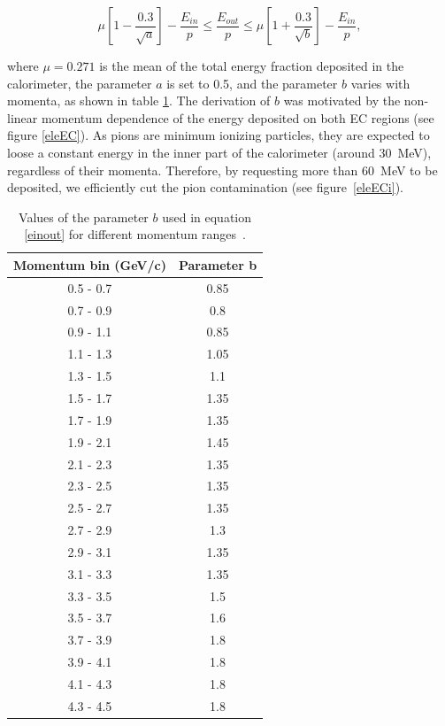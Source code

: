 \begin{equation}
\label{einout}
\mu  \left[1-\frac{0.3}{\sqrt{a}}\right] - \frac{E_{in}}{p} \leq 
\frac{E_{out}}{p} \leq 
\mu  \left[1+\frac{0.3}{\sqrt{b}}\right] - \frac{E_{in}}{p},
\end{equation}

where $\mu = 0.271$ is the mean of the total energy fraction deposited in the 
calorimeter, the parameter $a$ is set to 0.5, and the parameter 
$b$ varies with momenta, as shown in table \ref{tab:ecoutin-par}. The derivation of $b$ was motivated by the non-linear momentum dependence of the energy 
deposited on both EC regions (see figure \ref{eleEC}). As pions are 
minimum ionizing particles, they are expected to loose a constant energy in 
the inner part of the calorimeter (around 30~MeV), regardless of their 
momenta. Therefore, by requesting more than 60~MeV to be deposited, we 
efficiently cut the pion contamination (see figure~\ref{eleECi}).

\begin{table}[tbp]
  \centering
  \begin{tabular}{@{} cc @{}}
    \hline
    Momentum bin (GeV/c)& Parameter b \\ 
    \hline
    0.5 - 0.7 & 0.85 \\
    0.7 - 0.9 & 0.8  \\
    0.9 - 1.1 & 0.85 \\
    1.1 - 1.3 & 1.05 \\
    1.3 - 1.5 & 1.1  \\
    1.5 - 1.7 & 1.35 \\
    1.7 - 1.9 & 1.35 \\
    1.9 - 2.1 & 1.45 \\
    2.1 - 2.3 & 1.35 \\
    2.3 - 2.5 & 1.35 \\
    2.5 - 2.7 & 1.35 \\
    2.7 - 2.9 & 1.3  \\
    2.9 - 3.1 & 1.35 \\
    3.1 - 3.3 & 1.35 \\
    3.3 - 3.5 & 1.5  \\
    3.5 - 3.7 & 1.6  \\
    3.7 - 3.9 & 1.8  \\
    3.9 - 4.1 & 1.8  \\
    4.1 - 4.3 & 1.8  \\
    4.3 - 4.5 & 1.8  \\
    \hline
  \end{tabular}
  \caption{Values of the parameter $b$ used in equation \ref{einout} for 
           different momentum ranges~\cite{ElFassi:2008}.}
  \label{tab:ecoutin-par}
\end{table}

